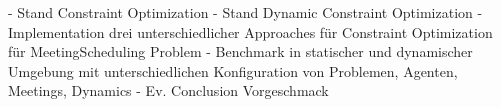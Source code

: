\begin{zusammenfassung}

\end{zusammenfassung}

- Stand Constraint Optimization
- Stand Dynamic Constraint Optimization
- Implementation drei unterschiedlicher Approaches für Constraint Optimization für MeetingScheduling Problem
- Benchmark in statischer und dynamischer Umgebung mit unterschiedlichen Konfiguration von Problemen, Agenten, Meetings, Dynamics
- Ev. Conclusion Vorgeschmack

